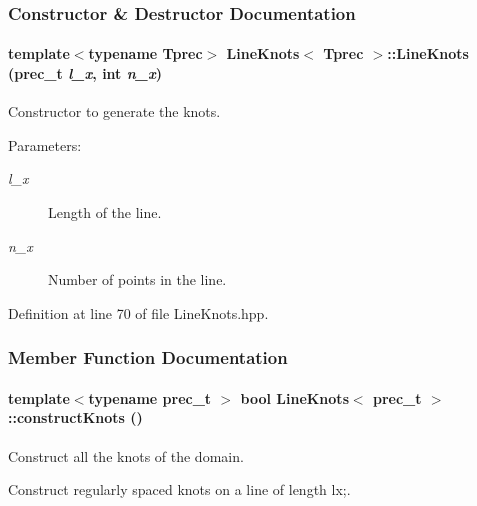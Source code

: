 \subsubsection{Constructor \& Destructor Documentation}
\hypertarget{classLineKnots_972c8612b36bd7cc82b867de54a488bd}{
\paragraph[{LineKnots}]{\setlength{\rightskip}{0pt plus 5cm}template$<$typename Tprec$>$ {\bf LineKnots}$<$ Tprec $>$::{\bf LineKnots} (prec\_\-t {\em l\_\-x}, \/  int {\em n\_\-x})}\hfill}
\label{classLineKnots_972c8612b36bd7cc82b867de54a488bd}


Constructor to generate the knots. 

\begin{Desc}
\item[Parameters:]
\begin{description}
\item[{\em l\_\-x}]Length of the line. \item[{\em n\_\-x}]Number of points in the line. \end{description}
\end{Desc}


Definition at line 70 of file LineKnots.hpp.

\subsubsection{Member Function Documentation}
\hypertarget{classLineKnots_de473737fc4dabcb3c4ce0bb56394e25}{
\paragraph[{constructKnots}]{\setlength{\rightskip}{0pt plus 5cm}template$<$typename prec\_\-t $>$ bool {\bf LineKnots}$<$ prec\_\-t $>$::constructKnots ()}\hfill}
\label{classLineKnots_de473737fc4dabcb3c4ce0bb56394e25}


Construct all the knots of the domain. 

Construct regularly spaced knots on a line of length lx;. 

